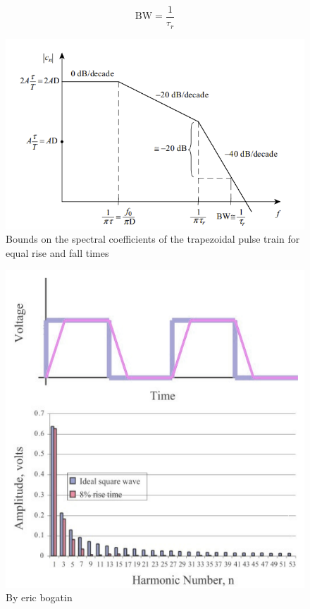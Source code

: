 \documentclass[12pt]{article}
\begin{document}
\[\text{BW} = \frac{1}{τ_r}\]

\begin{figure}[h!]
	\centering
	\includegraphics[keepaspectratio, width = \textwidth]{assets/magnitude_clock.png}
	\caption{Bounds on the spectral coefficients of the trapezoidal pulse train for equal rise and fall times}
\end{figure}

\begin{figure}[h!]
	\centering
	\includegraphics[keepaspectratio, height = .4\textheight, width = \textwidth]{assets/square_n_trapezoidal.png}
	\caption{By eric bogatin}
\end{figure}
\end{document}
